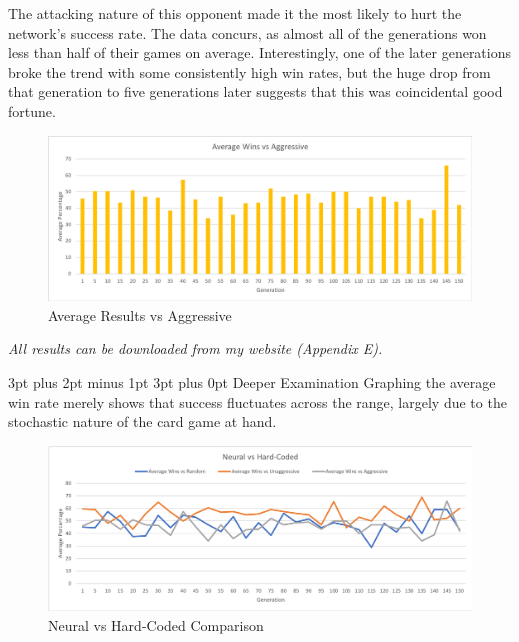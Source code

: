\documentclass[12pt,a4paper]{article}
\makeatletter
\renewcommand\subsection{\@startsection {subsection}{1}{2mm} %
                               {3pt plus 2pt minus 1pt} %
                               {3pt plus 0pt} %
                               {\normalfont\bfseries}}
\makeatother
\begin{document}
\newpage
The attacking nature of this opponent made it the most likely to hurt the network's success rate. The data concurs, as almost all of the generations won less than half of their games on average. Interestingly, one of the later generations broke the trend with some consistently high win rates, but the huge drop from that generation to five generations later suggests that this was coincidental good fortune.

\begin{figure}[h]
	\centering
	\includegraphics[width = \textwidth]{Agg1.png}
	\caption{Average Results vs Aggressive}
\end{figure}


\begin{small}
	\begin{center}
		\textit{All results can be downloaded from my website (Appendix E).}
	\end{center}
\end{small}

\subsection{Deeper Examination}
Graphing the average win rate merely shows that success fluctuates across the range, largely due to the stochastic nature of the card game at hand. 

\begin{figure}[h]
	\centering
	\includegraphics[width = \textwidth]{ComparisonLineGraph.png}
	\caption{Neural vs Hard-Coded Comparison}
\end{figure}
\end{document}
